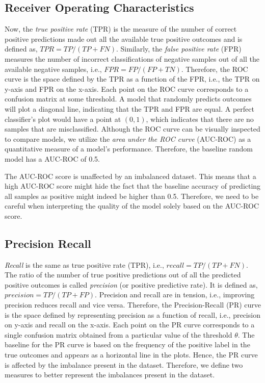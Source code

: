 \subsection{Receiver Operating Characteristics}
Now, the \textit{true positive rate} (TPR) is the measure of the number of correct positive predictions made out all the available true positive outcomes and is defined as, $TPR = TP/(TP+FN)$.
Similarly, the \textit{false positive rate} (FPR) measures the number of incorrect classifications of negative samples out of all the available negative samples, i.e., $FPR = FP/(FP+TN)$.
Therefore, the ROC curve is the space defined by the TPR as a function of the FPR, i.e., the TPR on y-axis and FPR on the x-axis. 
Each point on the ROC curve corresponds to a confusion matrix at some threshold.
A model that randomly predicts outcomes will plot a diagonal line, indicating that the TPR and FPR are equal.
A perfect classifier's plot would have a point at $(0,1)$, which indicates that there are no samples that are misclassified.
Although the ROC curve can be visually inspected to compare models, we utilize the \textit{area under the ROC curve} (AUC-ROC) as a quantitative measure of a model's performance.
Therefore, the baseline random model has a AUC-ROC of 0.5.

The AUC-ROC score is unaffected by an imbalanced dataset. 
This means that a high AUC-ROC score might hide the fact that the baseline accuracy of predicting all samples as positive might indeed be higher than 0.5.
Therefore, we need to be careful when interpreting the quality of the model solely based on the AUC-ROC score.

\subsection{Precision Recall}
\textit{Recall} is the same as true positive rate (TPR), i.e., $recall = TP/(TP+FN)$.
The ratio of the number of true positive predictions out of all the predicted positive outcomes is called \textit{precision} (or positive predictive rate).
It is defined as, $precision = TP/(TP+FP)$. 
Precision and recall are in tension, i.e., improving precision reduces recall and vice versa.
Therefore, the Precision-Recall (PR) curve is the space defined by representing precision as a function of recall, i.e., precision on y-axis and recall on the x-axis.
Each point on the PR curve corresponds to a single confusion matrix obtained from a particular value of the threshold $\theta$.
The baseline for the PR curve is based on the frequency of the positive label in the true outcomes and appears as a horizontal line in the plots.
Hence, the PR curve is affected by the imbalance present in the dataset.
Therefore, we define two measures to better represent the imbalances present in the \wikirfa dataset.

